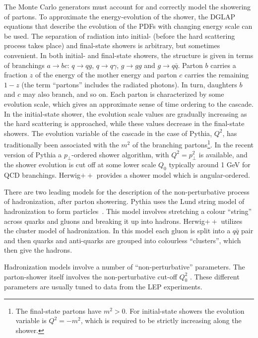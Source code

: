 The Monte Carlo generators must account for and correctly model the showering of partons. To approximate the energy-evolution of the shower, the DGLAP equations that describe the evolution of the PDFs with changing energy scale can be used. The separation of radiation into initial- (before the hard scattering process takes place) and final-state showers is arbitrary, but sometimes convenient.  In both initial- and final-state showers, the structure is given in terms of branchings $a \rightarrow bc$: $q \rightarrow qg$, $q \rightarrow q\gamma$, $g \rightarrow gg$ and $g \rightarrow q\bar{q}$. Parton $b$ carries a fraction $z$ of the energy of the mother energy and parton $c$ carries the remaining $1-z$ (the term ``partons'' includes the radiated photons).  In turn, daughters $b$ and $c$ may also branch, and so on. Each parton is characterized by some evolution scale, which gives an approximate sense of time ordering to the cascade. In the initial-state shower,  the evolution scale values are gradually increasing as the hard scattering is approached, while  these values decrease in the final-state showers. The evolution variable of the cascade in the case of {\sc Pythia}, $Q^2$, has traditionally been associated with the $m^2$ of the branching partons\footnote{The final-state partons have $m^2>0$. For initial-state showers the evolution variable is $Q^2=-m^2$, which is required to be strictly increasing along the shower.}. In the recent version of {\sc Pythia} a $p_{\perp}$-ordered shower algorithm, with $Q^2=p_{\perp}^2$ is available, and the shower evolution is cut off at some lower scale  $Q_0$ typically around 1 GeV for QCD branchings. {\sc Herwig}$++$ provides a shower model which is angular-ordered.

There are two leading models for the description of the non-perturbative process of hadronization, after parton showering. {\sc Pythia} uses the Lund string model of hadronization to form particles~\cite{LUNDMODEL}.  This model involves stretching a colour ``string'' across quarks and gluons and breaking it up into hadrons. %
{\sc Herwig}$++$ utilizes the cluster model of hadronization. In this model each gluon is split into a $q\bar{q}$ pair and then quarks and anti-quarks are grouped into colourless ``clusters'', which then give the hadrons.

Hadronization models involve a number of ``non-perturbative'' parameters. The parton-shower itself involves the non-perturbative cut-off $Q^2_0$ . These different parameters are usually tuned to data from the LEP experiments.


